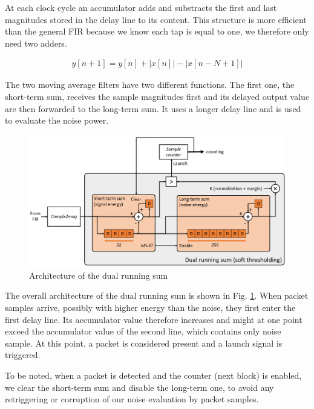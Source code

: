 \begin{enumerate}
    At each clock cycle an accumulator adds and substracts the first and last magnitudes stored in the delay line to its content. This structure is more efficient than the general FIR because we know each tap is equal to one, we therefore only need two adders. 

    \begin{align}
            y[n+1] = y[n] + \left|x[n]\right| - \left|x[n-N+1]\right|
    \end{align}

    The two moving average filters have two different functions. The first one, the short-term sum, receives the sample magnitudes first and its delayed output value are then forwarded to the long-term sum. It uses a longer delay line and is used to evaluate the noise power. 

    \begin{figure}[h]
        \centering
        \includegraphics[width=\linewidth]{figures/dual_running_sum_block.png}
        \caption{Architecture of the dual running sum}
        \label{fig:dual_runnign_sum}
    \end{figure}
    
    The overall architecture of the dual running sum is shown in Fig. \ref{fig:dual_runnign_sum}. When packet samples arrive, possibly with  higher energy than the noise, they first enter the first delay line. Its accumulator value therefore increases and might at one point exceed the accumulator value of the second line, which contains only noise sample. At this point, a packet is considered present and a launch signal is triggered. 

    To be noted, when a packet is detected and the counter (next block) is enabled, we clear the short-term sum and disable the long-term one, to avoid any retriggering or corruption of our noise evaluation by packet samples.



\end{enumerate}
